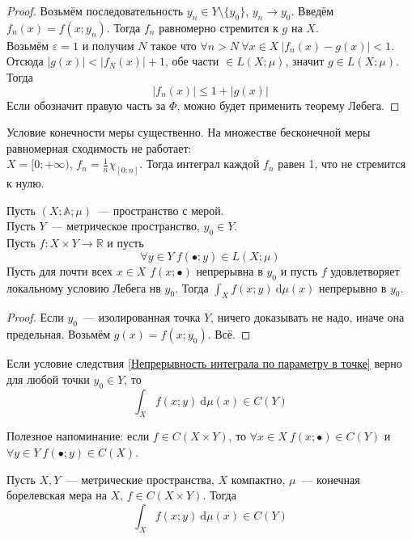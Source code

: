 \documentclass{article}
\let\eps\varepsilon
\begin{document}
    \begin{proof}
        Возьмём последовательность $y_n\in Y\setminus\{y_0\}$, $y_n\to y_0$. Введём $f_n(x)=f(x;y_n)$. Тогда $f_n$ равномерно стремится к $g$ на $X$.\\
        Возьмём $\eps=1$ и получим $N$ такое что $\forall n>N~\forall x\in X~|f_n(x)-g(x)|<1$.\\
        Отсюда $|g(x)|<|f_N(x)|+1$, обе части $\in L(X;\mu)$, значит $g\in L(X;\mu)$. Тогда
        $$
        |f_n(x)|\leqslant 1+|g(x)|
        $$
        Если обозначит правую часть за $\Phi$, можно будет применить теорему Лебега.
    \end{proof}
    \begin{example}
        Условие конечности меры существенно. На множестве бесконечной меры равномерная сходимость не работает:\\
        $X=[0;+\infty)$, $f_n=\frac1n\chi_{[0;n]}$. Тогда интеграл каждой $f_n$ равен 1, что не стремится к нулю.
    \end{example}
    \begin{corollary}
        \label{Непрерывность интеграла по параметру в точке}
        Пусть $(X;\mathbb A;\mu)$~--- пространство с мерой.\\
        Пусть $Y$~--- метрическое пространство, $y_0\in Y$.\\
        Пусть $f\colon X\times Y\to\mathbb R$ и пусть
        $$\forall y\in Y~f(\bullet;y)\in L(X;\mu)$$
        Пусть для почти всех $x\in X$ $f(x;\bullet)$ непрерывна в $y_0$ и пусть $f$ удовлетворяет локальному условию Лебега нв $y_0$. Тогда $\int_Xf(x;y)~\mathrm d\mu(x)$ непрерывно в $y_0$.
    \end{corollary}
    \begin{proof}
        Если $y_0$~--- изолированная точка $Y$, ничего доказывать не надо, иначе она предельная. Возьмём $g(x)=f(x;y_0)$. Всё.
    \end{proof}
    \begin{corollary}
        Если условие следствия \ref{Непрерывность интеграла по параметру в точке} верно для любой точки $y_0\in Y$, то
        $$
        \int_Xf(x;y)~\mathrm d\mu(x)\in C(Y)
        $$
    \end{corollary}
    \begin{remark}
        Полезное напоминание: если $f\in C(X\times Y)$, то $\forall x\in X~f(x;\bullet)\in C(Y)$ и $\forall y\in Y~f(\bullet;y)\in C(X)$.
    \end{remark}
    \begin{theorem}
        \label{Непрерывность интеграла по параметру на множестве}
        Пусть $X,Y$~--- метрические пространства, $X$ компактно, $\mu$~--- конечная борелевская мера на $X$, $f\in C(X\times Y)$. Тогда
        $$
        \int_Xf(x;y)~\mathrm d\mu(x)\in C(Y)
        $$
    \end{theorem}
\end{document}
